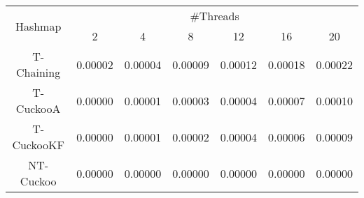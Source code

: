 \begin{tabular}{|c|c|c|c|c|c|c|}
\hline
\multirow{2}{*}{Hashmap} & \multicolumn{6}{c|}{\#Threads}\\\cline{2-7}& 2 & 4 & 8 & 12 & 16 & 20\\
\hline
\hline
T-Chaining & 0.00002 & 0.00004 & 0.00009 & 0.00012 & 0.00018 & 0.00022\\
T-CuckooA & 0.00000 & 0.00001 & 0.00003 & 0.00004 & 0.00007 & 0.00010\\
T-CuckooKF & 0.00000 & 0.00001 & 0.00002 & 0.00004 & 0.00006 & 0.00009\\
NT-Cuckoo & 0.00000 & 0.00000 & 0.00000 & 0.00000 & 0.00000 & 0.00000\\
\hline
\end{tabular}
